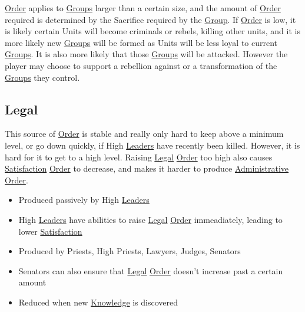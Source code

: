 \documentclass[11pt]{article}
\begin{document}
\hyperref[orgd146db7]{Order} applies to \hyperref[org21e4d88]{Groups} larger than a certain size, and the amount of \hyperref[orgd146db7]{Order} required is determined by the Sacrifice required by the \hyperref[org3bac9f0]{Group}. If \hyperref[orgd146db7]{Order} is low, it is likely certain Units will become criminals or rebels, killing other units, and it is more likely new \hyperref[org21e4d88]{Groups} will be formed as Units will be less loyal to current \hyperref[org21e4d88]{Groups}. It is also more likely that those \hyperref[org21e4d88]{Groups} will be attacked. However the player may choose to support a rebellion against or a transformation of the \hyperref[org21e4d88]{Groups} they control.\\
\subsection{Legal \label{org39099d7} \label{org9481f9c}}
\label{sec:org7fa5cae}
This source of \hyperref[orgd146db7]{Order} is stable and really only hard to keep above a minimum level, or go down quickly, if High \hyperref[org841e9de]{Leaders} have recently been killed. However, it is hard for it to get to a high level. Raising \hyperref[org39099d7]{Legal} \hyperref[orgd146db7]{Order} too high also causes \hyperref[orgda5f73b]{Satisfaction} \hyperref[orgd146db7]{Order} to decrease, and makes it harder to produce \hyperref[org6e4ede0]{Administrative} \hyperref[orgd146db7]{Order}.\\
\begin{itemize}
\item Produced passively by High \hyperref[org841e9de]{Leaders}\\
\item High \hyperref[org841e9de]{Leaders} have abilities to raise \hyperref[org39099d7]{Legal} \hyperref[orgd146db7]{Order} immeadiately, leading to lower \hyperref[orgda5f73b]{Satisfaction}\\
\item Produced by Priests, High Priests, Lawyers, Judges, Senators\\
\item Senators can also ensure that \hyperref[org39099d7]{Legal} \hyperref[orgd146db7]{Order} doesn't increase past a certain amount\\
\item Reduced when new \hyperref[orgd7203c2]{Knowledge} is discovered\\
\end{itemize}
\end{document}
